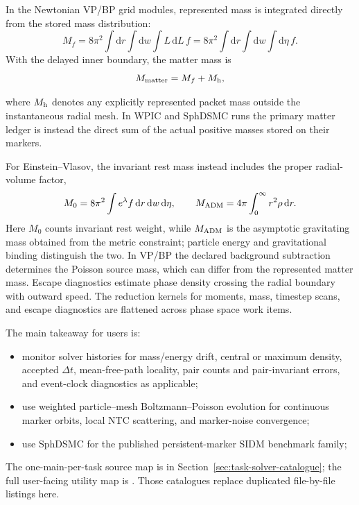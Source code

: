 \documentclass[11pt]{article}
\newcommand{\dd}{\mathrm d}
\newcommand{\code}[1]{\texttt{\detokenize{#1}}}
\newif\ifvenusfullcpu
\begin{document}
In the Newtonian VP/BP grid modules, represented mass is integrated directly
from the stored mass distribution:
\[
  M_f = 8\pi^2\int \dd r\int\dd w\int L\,\dd L\, f
      = 8\pi^2\int\dd r\int\dd w\int\dd\eta\, f .
\]
With the delayed inner boundary, the matter mass is
\[
  M_{\rm matter}=M_f+M_{\rm h},
\]
\ifvenusfullcpu
where \(M_{\rm h}\) is the direct sum of carrier-packet masses in
Section~\ref{sec:delayed-inner-carrier}.
\else
where \(M_{\rm h}\) denotes any explicitly represented packet mass outside the
instantaneous radial mesh.  In WPIC and SphDSMC runs the primary
matter ledger is instead the direct sum of the actual positive masses stored
on their markers.
\fi
For Einstein--Vlasov, the invariant rest mass instead includes the proper
radial-volume factor,
\[
 M_0=8\pi^2\int e^\lambda f\,\dd r\,\dd w\,\dd\eta,
 \qquad
 M_{\rm ADM}=4\pi\int_0^\infty r^2\rho\,\dd r.
\]
Here \(M_0\) counts invariant rest weight, while \(M_{\rm ADM}\) is the
asymptotic gravitating mass obtained from the metric constraint; particle
energy and gravitational binding distinguish the two.  In VP/BP the
declared background subtraction determines the Poisson source mass, which
can differ from the represented matter mass.  Escape diagnostics estimate
phase density crossing the radial boundary with outward speed.  The reduction
kernels for moments, mass, timestep scans, and escape diagnostics are
flattened across phase space work items.

The main takeaway for users is:
\begin{itemize}
\ifvenusfullcpu
\item monitor \code{history.csv} for mass drift, escape estimates, compactness
gap, \code{dt}, and BP operator ratios;
\item use the canonical-orbit solver for fully kinetic finite-volume
Boltzmann--Poisson evolution with infrequent field reconstruction;
\else
\item monitor solver histories for mass/energy drift, central or maximum
density, accepted \(\Delta t\), mean-free-path locality, pair counts and
pair-invariant errors, and event-clock diagnostics as applicable;
\item use weighted particle--mesh Boltzmann--Poisson evolution for continuous
marker orbits, local NTC scattering, and marker-noise convergence;
\item use SphDSMC for the published persistent-marker SIDM benchmark family;
\fi
\end{itemize}

The one-main-per-task source map is in
Section~\ref{sec:task-solver-catalogue}; the full user-facing utility map is
.  Those catalogues replace duplicated
file-by-file listings here.
\end{document}
